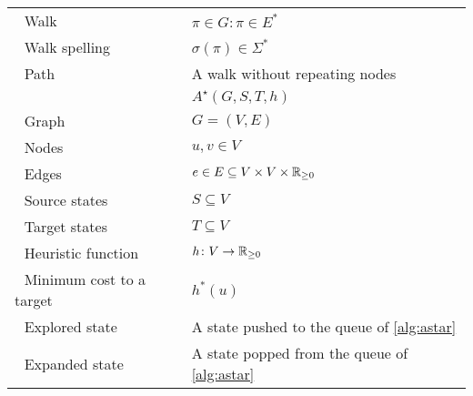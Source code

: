 \begin{table}[!h]
\begin{tabular}{ll}
	\,\, Walk& $\pi \in G: \pi \in E^*$\\
	\,\, Walk spelling& $\sigma(\pi) \in \Sigma^*$\\
	\,\, Path& A walk without repeating nodes\\
	\hline
	\textbf{\A} & $A^\star(G,S,T,h)$\\
	\,\, Graph& $G=(V,E)$\\
	\,\, Nodes& $u,v \in V$\\
	\,\, Edges& $e \in E \subseteq V \times V \times \mathbb{R}_{\geq 0}$\\ 
	\,\, Source states& $S \subseteq V$\\
	\,\, Target states& $T \subseteq V$\\
	\,\, Heuristic function& $h \colon V \to \mathbb{R}_{\geq 0}$\\
	\,\, Minimum cost to a target& $h^*(u)$\\
	\,\, Explored state & A state pushed to the queue of \cref{alg:astar}\\
	\,\, Expanded state & A state popped from the queue of \cref{alg:astar}\\
	\hline
\end{tabular}
\end{table}